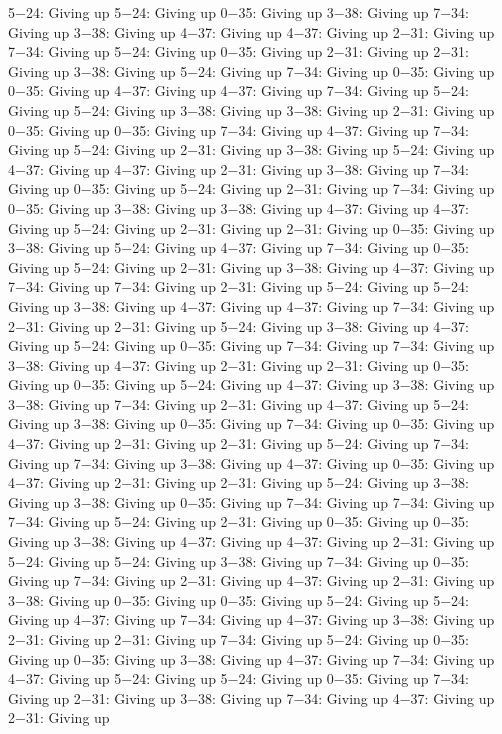 5−24: Giving up
5−24: Giving up
0−35: Giving up
3−38: Giving up
7−34: Giving up
3−38: Giving up
4−37: Giving up
4−37: Giving up
2−31: Giving up
7−34: Giving up
5−24: Giving up
0−35: Giving up
2−31: Giving up
2−31: Giving up
3−38: Giving up
5−24: Giving up
7−34: Giving up
0−35: Giving up
0−35: Giving up
4−37: Giving up
4−37: Giving up
7−34: Giving up
5−24: Giving up
5−24: Giving up
3−38: Giving up
3−38: Giving up
2−31: Giving up
0−35: Giving up
0−35: Giving up
7−34: Giving up
4−37: Giving up
7−34: Giving up
5−24: Giving up
2−31: Giving up
3−38: Giving up
5−24: Giving up
4−37: Giving up
4−37: Giving up
2−31: Giving up
3−38: Giving up
7−34: Giving up
0−35: Giving up
5−24: Giving up
2−31: Giving up
7−34: Giving up
0−35: Giving up
3−38: Giving up
3−38: Giving up
4−37: Giving up
4−37: Giving up
5−24: Giving up
2−31: Giving up
2−31: Giving up
0−35: Giving up
3−38: Giving up
5−24: Giving up
4−37: Giving up
7−34: Giving up
0−35: Giving up
5−24: Giving up
2−31: Giving up
3−38: Giving up
4−37: Giving up
7−34: Giving up
7−34: Giving up
2−31: Giving up
5−24: Giving up
5−24: Giving up
3−38: Giving up
4−37: Giving up
4−37: Giving up
7−34: Giving up
2−31: Giving up
2−31: Giving up
5−24: Giving up
3−38: Giving up
4−37: Giving up
5−24: Giving up
0−35: Giving up
7−34: Giving up
7−34: Giving up
3−38: Giving up
4−37: Giving up
2−31: Giving up
2−31: Giving up
0−35: Giving up
0−35: Giving up
5−24: Giving up
4−37: Giving up
3−38: Giving up
3−38: Giving up
7−34: Giving up
2−31: Giving up
4−37: Giving up
5−24: Giving up
3−38: Giving up
0−35: Giving up
7−34: Giving up
0−35: Giving up
4−37: Giving up
2−31: Giving up
2−31: Giving up
5−24: Giving up
7−34: Giving up
7−34: Giving up
3−38: Giving up
4−37: Giving up
0−35: Giving up
4−37: Giving up
2−31: Giving up
2−31: Giving up
5−24: Giving up
3−38: Giving up
3−38: Giving up
0−35: Giving up
7−34: Giving up
7−34: Giving up
7−34: Giving up
5−24: Giving up
2−31: Giving up
0−35: Giving up
0−35: Giving up
3−38: Giving up
4−37: Giving up
4−37: Giving up
2−31: Giving up
5−24: Giving up
5−24: Giving up
3−38: Giving up
7−34: Giving up
0−35: Giving up
7−34: Giving up
2−31: Giving up
4−37: Giving up
2−31: Giving up
3−38: Giving up
0−35: Giving up
0−35: Giving up
5−24: Giving up
5−24: Giving up
4−37: Giving up
7−34: Giving up
4−37: Giving up
3−38: Giving up
2−31: Giving up
2−31: Giving up
7−34: Giving up
5−24: Giving up
0−35: Giving up
0−35: Giving up
3−38: Giving up
4−37: Giving up
7−34: Giving up
4−37: Giving up
5−24: Giving up
5−24: Giving up
0−35: Giving up
7−34: Giving up
2−31: Giving up
3−38: Giving up
7−34: Giving up
4−37: Giving up
2−31: Giving up
